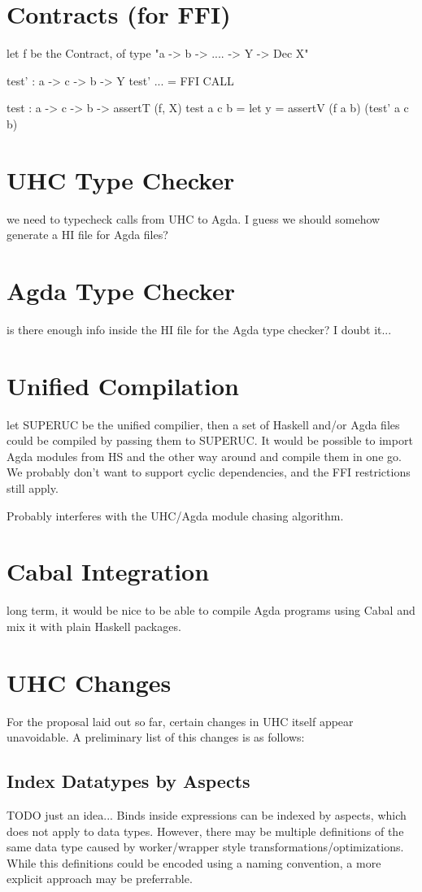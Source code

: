 \documentclass[12pt, a4paper, twoside]{report}
\begin{document}
\section{Contracts (for FFI)}

let f be the Contract, of type "a -> b -> .... -> Y -> Dec X"

test' : a -> c -> b -> Y
test' ... = FFI CALL

test : a -> c -> b -> assertT (f, X)
test a c b = let y = assertV (f a b) (test' a c b)

\section{UHC Type Checker}
we need to typecheck calls from UHC to Agda. I guess we should somehow generate a HI file for Agda files?

\section{Agda Type Checker}
is there enough info inside the HI file for the Agda type checker? I doubt it...

\section{Unified Compilation}
let SUPERUC be the unified compilier, then a set of Haskell and/or Agda files
could be compiled by passing them to SUPERUC. It would be possible to import
Agda modules from HS and the other way around and compile them in one go.
We probably don't want to support cyclic dependencies, and the FFI restrictions still apply.

Probably interferes with the UHC/Agda module chasing algorithm.

\section{Cabal Integration}
long term, it would be nice to be able to compile Agda programs using Cabal and
mix it with plain Haskell packages.

\section{UHC Changes}
For the proposal laid out so far, certain changes in UHC itself appear
unavoidable. A preliminary list of this changes is as follows:

\subsection{Index Datatypes by Aspects}
TODO just an idea...
Binds inside expressions can be indexed by aspects, which does
not apply to data types. However, there may be multiple definitions
of the same data type caused by worker/wrapper style transformations/optimizations.
While this definitions could be encoded using a naming convention, a more explicit
approach may be preferrable.
\end{document}
